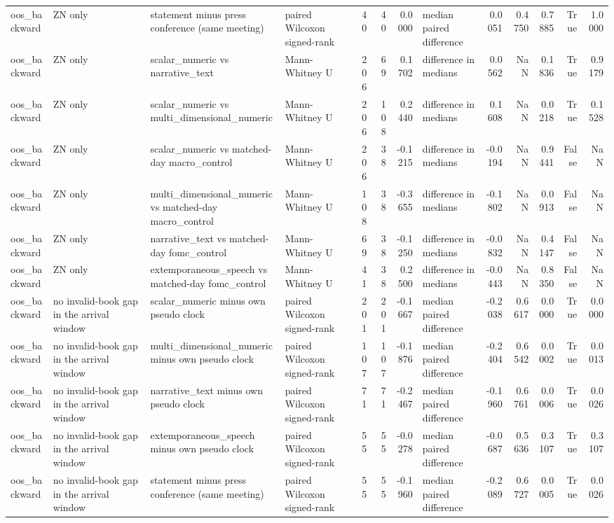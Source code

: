 \begin{tabular}{llllrrrlrrrrr}
oos_backward & ZN only & statement minus press conference (same meeting) & paired Wilcoxon signed-rank & 40 & 40 & 0.0000 & median paired difference & 0.0051 & 0.4750 & 0.7885 & True & 1.0000 \\
oos_backward & ZN only & scalar_numeric vs narrative_text & Mann-Whitney U & 206 & 69 & 0.1702 & difference in medians & 0.0562 & NaN & 0.1836 & True & 0.9179 \\
oos_backward & ZN only & scalar_numeric vs multi_dimensional_numeric & Mann-Whitney U & 206 & 108 & 0.2440 & difference in medians & 0.1608 & NaN & 0.0218 & True & 0.1528 \\
oos_backward & ZN only & scalar_numeric vs matched-day macro_control & Mann-Whitney U & 206 & 38 & -0.1215 & difference in medians & -0.0194 & NaN & 0.9441 & False & NaN \\
oos_backward & ZN only & multi_dimensional_numeric vs matched-day macro_control & Mann-Whitney U & 108 & 38 & -0.3655 & difference in medians & -0.1802 & NaN & 0.0913 & False & NaN \\
oos_backward & ZN only & narrative_text vs matched-day fomc_control & Mann-Whitney U & 69 & 38 & -0.1250 & difference in medians & -0.0832 & NaN & 0.4147 & False & NaN \\
oos_backward & ZN only & extemporaneous_speech vs matched-day fomc_control & Mann-Whitney U & 41 & 38 & 0.2500 & difference in medians & -0.0443 & NaN & 0.8350 & False & NaN \\
oos_backward & no invalid-book gap in the arrival window & scalar_numeric minus own pseudo clock & paired Wilcoxon signed-rank & 201 & 201 & -0.1667 & median paired difference & -0.2038 & 0.6617 & 0.0000 & True & 0.0000 \\
oos_backward & no invalid-book gap in the arrival window & multi_dimensional_numeric minus own pseudo clock & paired Wilcoxon signed-rank & 107 & 107 & -0.1876 & median paired difference & -0.2404 & 0.6542 & 0.0002 & True & 0.0013 \\
oos_backward & no invalid-book gap in the arrival window & narrative_text minus own pseudo clock & paired Wilcoxon signed-rank & 71 & 71 & -0.2467 & median paired difference & -0.1960 & 0.6761 & 0.0006 & True & 0.0026 \\
oos_backward & no invalid-book gap in the arrival window & extemporaneous_speech minus own pseudo clock & paired Wilcoxon signed-rank & 55 & 55 & -0.0278 & median paired difference & -0.0687 & 0.5636 & 0.3107 & True & 0.3107 \\
oos_backward & no invalid-book gap in the arrival window & statement minus press conference (same meeting) & paired Wilcoxon signed-rank & 55 & 55 & -0.1960 & median paired difference & -0.2089 & 0.6727 & 0.0005 & True & 0.0026 \\

\end{tabular}
